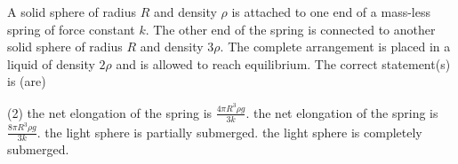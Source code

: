 
\item A solid sphere of radius $R$ and density $\rho$ is attached to one end of a mass-less spring of force constant $k$. The other end of the spring is connected to another solid sphere of radius $R$ and density $3\rho$. The complete arrangement is placed in a liquid of density $2\rho$ and is allowed to reach equilibrium. The correct statement(s) is (are)
    \begin{tasks}(2)
        \task the net elongation of the spring is $\frac{4\pi R^3 \rho g}{3k}$.
        \task the net elongation of the spring is $\frac{8\pi R^3 \rho g}{3k}$.
        \task the light sphere is partially submerged.
        \task the light sphere is completely submerged.
    \end{tasks}
